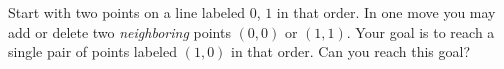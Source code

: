 Start with two points on a line labeled $0$, $1$ in that order. In one move you may add or delete two \emph{neighboring} points $(0, 0)$ or $(1, 1)$. Your goal is to reach a single pair of points labeled $(1, 0)$ in that order. Can you reach this goal?
